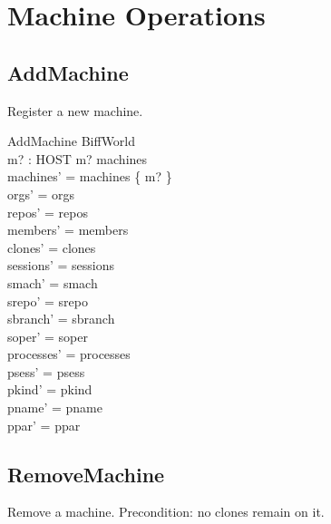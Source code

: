 \documentclass[a4paper,10pt,fleqn]{article}
\begin{document}
\section{Machine Operations}

\subsection{AddMachine}

Register a new machine.

\begin{schema}{AddMachine}
  \Delta BiffWorld \\
  m? : HOST
  \where
  m? \notin machines \\
  machines' = machines \cup \{ m? \} \\
  orgs' = orgs \\
  repos' = repos \\
  members' = members \\
  clones' = clones \\
  sessions' = sessions \\
  smach' = smach \\
  srepo' = srepo \\
  sbranch' = sbranch \\
  soper' = soper \\
  processes' = processes \\
  psess' = psess \\
  pkind' = pkind \\
  pname' = pname \\
  ppar' = ppar
\end{schema}

\subsection{RemoveMachine}

Remove a machine.  Precondition: no clones remain on it.
\end{document}

